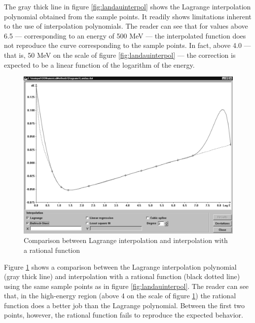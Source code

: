 The gray thick line in figure \ref{fig:landauinterpol} shows the
Lagrange interpolation polynomial obtained from the sample points.
It readily shows limitations inherent to the use of interpolation
polynomials. The reader can see that for values above 6.5 ---
corresponding to an energy of 500 MeV --- the interpolated
function does not reproduce the curve corresponding to the sample
points. In fact, above 4.0 --- that is,  50 MeV on the scale of
figure \ref{fig:landauinterpol} --- the correction is expected to
be a linear function of the logarithm of the energy.

\begin{figure}
\label{fig:interpolex2}
\centering\includegraphics[width=12cm]{Figures/LagrangeVsRational}
\caption{Comparison between Lagrange interpolation and
interpolation with a rational function}
\end{figure}
Figure \ref{fig:interpolex2} shows a comparison between the
Lagrange interpolation polynomial (gray thick line) and
interpolation with a rational function (black dotted line) using
the same sample points as in figure \ref{fig:landauinterpol}. The
reader can see that, in the high-energy region (above 4 on the
scale of figure \ref{fig:interpolex2}) the rational function does
a better job than the Lagrange polynomial. Between the first two
points, however, the rational function fails to reproduce the
expected behavior.

